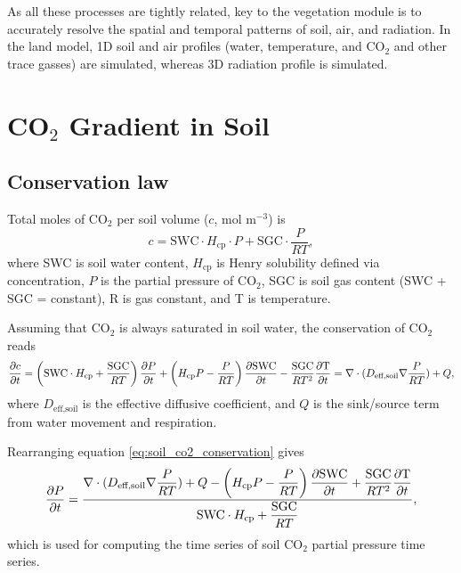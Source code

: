 \documentclass[twoside,10pt]{report}
\begin{document}
\par As all these processes are tightly related, key to the vegetation module is to accurately resolve the spatial and temporal patterns of soil, air, and radiation. In the land model, 1D soil and air profiles (water, temperature, and CO$_2$ and other trace gasses) are simulated, whereas 3D radiation profile is simulated.




\section{CO$_2$ Gradient in Soil}

\subsection{Conservation law}

\par Total moles of CO$_2$ per soil volume ($c$, mol m$^{-3}$) is
\begin{equation}
    c = \text{SWC} \cdot H_\text{cp} \cdot P + \text{SGC} \cdot \dfrac{P}{RT},
\end{equation}
where SWC is soil water content, $H_\text{cp}$ is Henry solubility defined via concentration, $P$ is the partial pressure of CO$_2$, SGC is soil gas content (SWC + SGC = constant), R is gas constant, and T is temperature.

\par Assuming that CO$_2$ is always saturated in soil water, the conservation of CO$_2$ reads
\begin{equation}
    \dfrac{\partial c}{\partial t} = 
        \left( \text{SWC} \cdot H_\text{cp} + \dfrac{\text{SGC}}{RT} \right) \dfrac{\partial P}{\partial t} + 
        \left( H_\text{cp} P - \dfrac{P}{RT} \right) \dfrac{\partial \text{SWC}}{\partial t} -
        \dfrac{\text{SGC}}{RT^2} \dfrac{\partial \text{T}}{\partial t} =
    \nabla \cdot (D_\text{eff,soil} \nabla \dfrac{P}{RT}) + Q, \label{eq:soil_co2_conservation}
\end{equation}
where $D_\text{eff,soil}$ is the effective diffusive coefficient, and $Q$ is the sink/source term from water movement and respiration.

\par Rearranging equation \ref{eq:soil_co2_conservation} gives
\begin{equation}
    \dfrac{\partial P}{\partial t} = 
        \dfrac{ \nabla \cdot (D_\text{eff,soil} \nabla \dfrac{P}{RT}) + Q - 
                \left( H_\text{cp} P - \dfrac{P}{RT} \right) \dfrac{\partial \text{SWC}}{\partial t} +
                \dfrac{\text{SGC}}{RT^2} \dfrac{\partial \text{T}}{\partial t}}
              {\text{SWC} \cdot H_\text{cp} + \dfrac{\text{SGC}}{RT}}, \label{eq:soil_co2_dpdt}
\end{equation}
which is used for computing the time series of soil CO$_2$ partial pressure time series.
\end{document}
